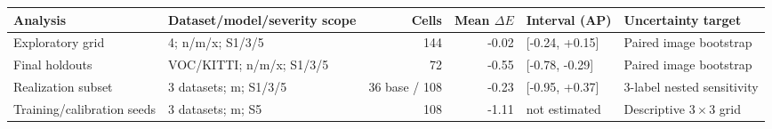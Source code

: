 \begin{tabular}{llrrll}
\toprule
Analysis & Dataset/model/severity scope & Cells & Mean $\Delta E$ & Interval (AP) & Uncertainty target \\
\midrule
Exploratory grid & 4; n/m/x; S1/3/5 & 144 & -0.02 & [-0.24, +0.15] & Paired image bootstrap \\
Final holdouts & VOC/KITTI; n/m/x; S1/3/5 & 72 & -0.55 & [-0.78, -0.29] & Paired image bootstrap \\
Realization subset & 3 datasets; m; S1/3/5 & 36 base / 108 & -0.23 & [-0.95, +0.37] & 3-label nested sensitivity \\
Training/calibration seeds & 3 datasets; m; S5 & 108 & -1.11 & not estimated & Descriptive $3\times3$ grid \\
\bottomrule
\end{tabular}
